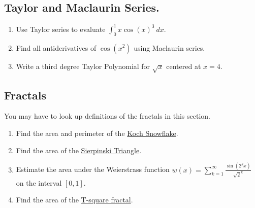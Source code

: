 \documentclass{article}
\begin{document}
\subsection{Taylor and Maclaurin Series.}
\begin{enumerate}
\item Use Taylor series to evaluate $\displaystyle\int_0^1x\cos(x)^3\ dx$.
\item Find all antiderivatives of $\cos(x^2)$ using Maclaurin series.
\item Write a third degree Taylor Polynomial for $\sqrt{x}$ centered at $x = 4$.
\end{enumerate}

\subsection{Fractals}
You may have to look up definitions of the fractals in this section.
\begin{enumerate}
\item Find the area and perimeter of the \href{https://en.wikipedia.org/wiki/Koch_snowflake}{Koch Snowflake}.
\item Find the area of the \href{https://en.wikipedia.org/wiki/Sierpi\%C5\%84ski_triangle}{Sierpinski Triangle}.
\item Estimate the area under the Weierstrass function $\displaystyle w(x)=\sum_{k=1}^{\infty} \frac{\sin \left(2^k x\right)}{\sqrt{2}^k}$ on the interval $[0,1]$.
\item Find the area of the \href{https://en.wikipedia.org/wiki/T-square_(fractal)}{T-square fractal}.
\end{enumerate}
\end{document}
